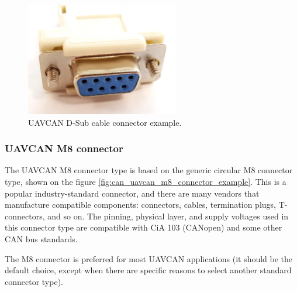 \begin{figure}[hbt]
    \centering
    \includegraphics[width=0.6\textwidth]{physical_layer/de-9_cable_female_socket}
    \caption{UAVCAN D-Sub cable connector example.
    \label{fig:can_uavcan_d_sub_connector_cable}}
\end{figure}

\clearpage  %
\subsubsection{UAVCAN M8 connector}

The UAVCAN M8 connector type is based on the generic circular M8 connector type,
shown on the figure \ref{fig:can_uavcan_m8_connector_example}.
This is a popular industry-standard connector, and there are many vendors that manufacture compatible components:
connectors, cables, termination plugs, T-connectors, and so on.
The pinning, physical layer, and supply voltages used in this connector type are compatible with CiA 103 (CANopen)
and some other CAN bus standards.

The M8 connector is preferred for most UAVCAN applications (it should be the default choice,
except when there are specific reasons to select another standard connector type).

